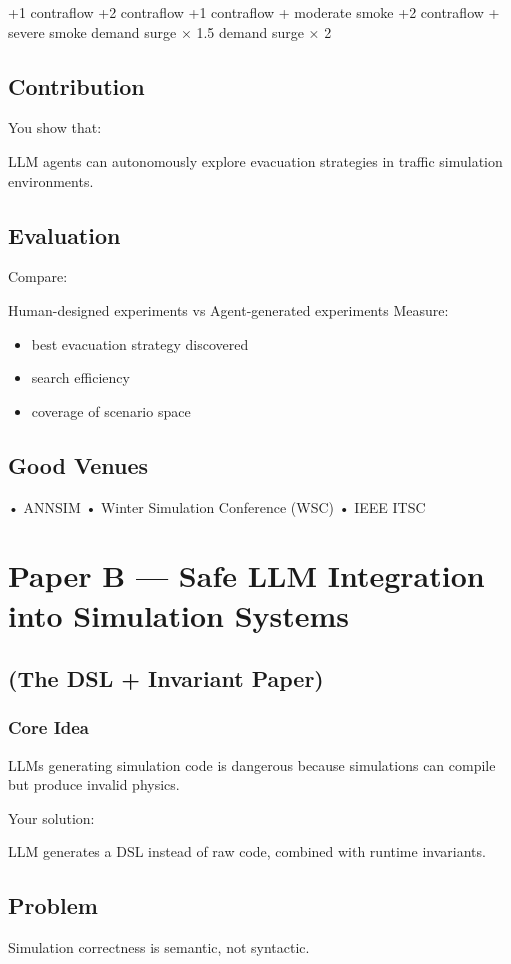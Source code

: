 +1 contraflow
+2 contraflow
+1 contraflow + moderate smoke
+2 contraflow + severe smoke
demand surge × 1.5
demand surge × 2
\section*{Contribution}
You show that:

LLM agents can autonomously explore evacuation strategies in traffic simulation environments.

\section*{Evaluation}
Compare:

Human-designed experiments
vs
Agent-generated experiments
Measure:

\begin{itemize}
\item best evacuation strategy discovered


\item search efficiency


\item coverage of scenario space


\end{itemize}
\section*{Good Venues}
• ANNSIM
• Winter Simulation Conference (WSC)
• IEEE ITSC

\chapter*{Paper B — Safe LLM Integration into Simulation Systems}
\section*{(The DSL + Invariant Paper)}
\subsection*{Core Idea}
LLMs generating simulation code is dangerous because simulations can compile but produce invalid physics.

Your solution:

LLM generates a DSL instead of raw code, combined with runtime invariants.

\section*{Problem}
Simulation correctness is semantic, not syntactic.

